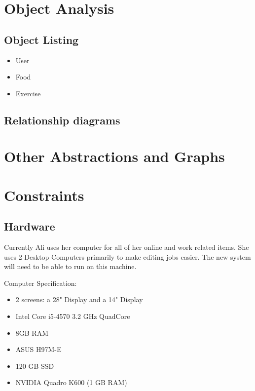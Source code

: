\section{Object Analysis}

\subsection{Object Listing}

\begin{itemize}
\item User
\item Food
\item Exercise
\end{itemize}

\subsection{Relationship diagrams}

\section{Other Abstractions and Graphs}


\section{Constraints}

\subsection{Hardware}
Currently Ali uses her computer for all of her online and work related items. She uses 2 Desktop Computers primarily to make editing jobs easier. The new system will need to be able to run on this machine.

Computer Specification:

\begin{itemize}
\item 2 screens: a 28" Display and a 14" Display
\item Intel Core i5-4570 3.2 GHz QuadCore
\item 8GB RAM
\item ASUS H97M-E
\item 120 GB SSD
\item NVIDIA Quadro K600 (1 GB RAM)
\end{itemize}

